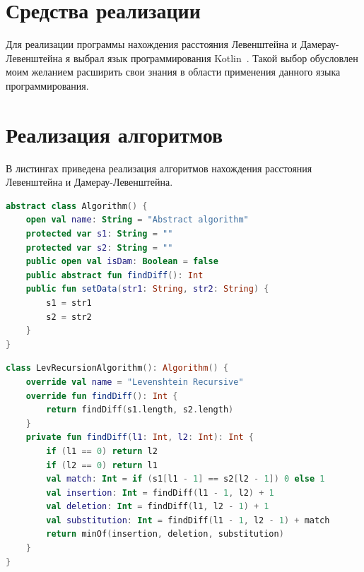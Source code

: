 \documentclass[12pt]{report}
\begin{document}
    \section{Средства реализации}
    Для реализации программы нахождения расстояния Левенштейна и Дамерау-Левенштейна
    я выбрал язык программирования Kotlin~\cite{kotlin}. Такой выбор обусловлен моим желанием
    расширить свои знания в области применения данного языка программирования.


    \section{Реализация алгоритмов}
    В листингах приведена реализация алгоритмов нахождения расстояния Левенштейна и Дамерау-Левенштейна.

    \begin{lstlisting}[label={lst:algbase},caption=Базовый класс для всех алгоритмов,
        language=kotlin]
abstract class Algorithm() {
    open val name: String = "Abstract algorithm"
    protected var s1: String = ""
    protected var s2: String = ""
    public open val isDam: Boolean = false
    public abstract fun findDiff(): Int
    public fun setData(str1: String, str2: String) {
        s1 = str1
        s2 = str2
    }
}
    \end{lstlisting}

    \begin{lstlisting}[label={lst:levrecur},caption=Метод для нахождения расстояния Левенштейна рекурсивно,
        language=kotlin]
class LevRecursionAlgorithm(): Algorithm() {
    override val name = "Levenshtein Recursive"
    override fun findDiff(): Int {
        return findDiff(s1.length, s2.length)
    }
    private fun findDiff(l1: Int, l2: Int): Int {
        if (l1 == 0) return l2
        if (l2 == 0) return l1
        val match: Int = if (s1[l1 - 1] == s2[l2 - 1]) 0 else 1
        val insertion: Int = findDiff(l1 - 1, l2) + 1
        val deletion: Int = findDiff(l1, l2 - 1) + 1
        val substitution: Int = findDiff(l1 - 1, l2 - 1) + match
        return minOf(insertion, deletion, substitution)
    }
}
    \end{lstlisting}
\end{document}
